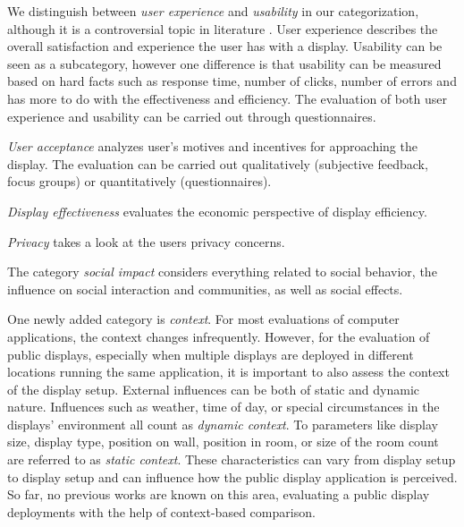 	



	We distinguish between \textit{user experience} and \textit{usability} in our categorization, although it is a controversial topic in literature \cite{bevan2009difference}.
	User experience describes the overall satisfaction and experience the user has with a display. Usability can be seen as a subcategory, however one difference is that usability can be measured based on hard facts such as response time, number of clicks, number of errors and has more to do with the effectiveness and efficiency. The evaluation of both user experience and usability can be carried out through questionnaires. %

	\textit{User acceptance} analyzes user's motives and incentives for approaching the display. The evaluation can be carried out qualitatively (subjective feedback, focus groups) or quantitatively (questionnaires).

	\textit{Display effectiveness} evaluates the economic perspective of display efficiency. 

	\textit{Privacy} takes a look at the users privacy concerns.

	The category \textit{social impact} considers everything related to social behavior, the influence on social interaction and communities, as well as social effects.



	One newly added category is \textit{context}. For most evaluations of computer applications, the context changes infrequently. However, for the evaluation of public displays, especially when multiple displays are deployed in different locations running the same application, it is important to also assess the context of the display setup. External influences can be both of static and dynamic nature. Influences such as weather, time of day, or special circumstances in the displays' environment all count as \textit{dynamic context}. To parameters like display size, display type, position on wall, position in room, or size of the room count are referred to as \textit{static context}. These characteristics can vary from display setup to display setup and can influence how the public display application is perceived.
	So far, no previous works are known on this area, evaluating a public display deployments with the help of context-based comparison. 

